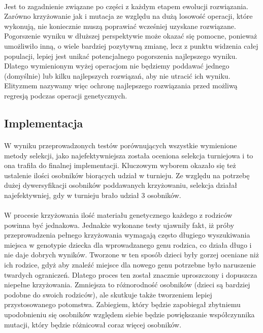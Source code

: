\paragraph{}Jest to zagadnienie związane po części z każdym etapem ewolucji rozwiązania. Zarówno krzyżowanie jak i mutacja ze względu na dużą losowość operacji, które wykonują, nie koniecznie muszą poprawiać wcześniej uzyskane rozwiązane. Pogorszenie wyniku w dłuższej perspektywie może okazać się pomocne, ponieważ umożliwiło inną, o wiele bardziej pozytywną zmianę, lecz z punktu widzenia całej populacji, lepiej jest unikać potencjalnego pogorszenia najlepszego wyniku. Dlatego wymienionym wyżej operacjom nie będziemy poddawać jednego (domyślnie) lub kilku najlepszych rozwiązań, aby nie utracić ich wyniku. Elityzmem nazywamy więc ochronę najlepszego rozwiązania przed możliwą regresją podczas operacji genetycznych.
\subsection{Implementacja}
\paragraph{}W wyniku przeprowadzonych testów porównujących wszystkie wymienione metody selekcji, jako najefektywniejsza została oceniona selekcja turniejowa i to ona trafiła do finalnej implementacji. Kluczowym wyborem okazało się też ustalenie ilości osobników biorących udział w turnieju. Ze względu na potrzebę dużej dywersyfikacji osobników poddawanych krzyżowaniu, selekcja działał najefektywniej, gdy w turnieju brało udział 3 osobników.
\paragraph{}W procesie krzyżowania ilość materiału genetycznego każdego z rodziców powinna być jednakowa. Jednakże wykonane testy ujawniły fakt, iż próby przeprowadzenia pełnego krzyżowania wymagają często długiego wyszukiwania miejsca w genotypie dziecka dla wprowadzanego genu rodzica, co działa długo i nie daje dobrych wyników. Tworzone w ten sposób dzieci były gorzej oceniane niż ich rodzice, gdyż aby znaleźć miejsce dla nowego genu potrzebne było naruszenie twardych ograniczeń. Dlatego proces ten został znacznie uproszczony i dopuszcza niepełne krzyżowania. Zmniejsza to różnorodność osobników (dzieci są bardziej podobne do swoich rodziców), ale skutkuje także tworzeniem lepiej przystosowanego potomstwa. Zabiegiem, który będzie zapobiegał zbytniemu upodobnieniu się osobników względem siebie będzie powiększanie współczynnika mutacji, który będzie różnicował coraz więcej osobników.
